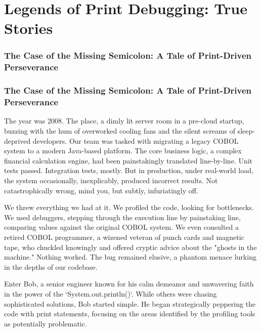 \documentclass{article}
\begin{document}
{{{{%

\part*{Legends of Print Debugging: True Stories} %
\label{part-8-Legends_of_Print_Debugging__True_Stories}


\section*{The Case of the Missing Semicolon: A Tale of Print-Driven Perseverance} %
\label{chapter-8-1-The_Case_of_the_Missing_Semicolon__A_Tal}

\section*{The Case of the Missing Semicolon: A Tale of Print-Driven Perseverance}

The year was 2008. The place, a dimly lit server room in a pre-cloud startup, buzzing with the hum of overworked cooling fans and the silent screams of sleep-deprived developers. Our team was tasked with migrating a legacy COBOL system to a modern Java-based platform. The core business logic, a complex financial calculation engine, had been painstakingly translated line-by-line. Unit tests passed. Integration tests, mostly. But in production, under real-world load, the system occasionally, inexplicably, produced incorrect results. Not catastrophically wrong, mind you, but subtly, infuriatingly off.

We threw everything we had at it. We profiled the code, looking for bottlenecks. We used debuggers, stepping through the execution line by painstaking line, comparing values against the original COBOL system. We even consulted a retired COBOL programmer, a wizened veteran of punch cards and magnetic tape, who chuckled knowingly and offered cryptic advice about the "ghosts in the machine." Nothing worked. The bug remained elusive, a phantom menace lurking in the depths of our codebase.

Enter Bob, a senior engineer known for his calm demeanor and unwavering faith in the power of the `System.out.println()`. While others were chasing sophisticated solutions, Bob started simple. He began strategically peppering the code with print statements, focusing on the areas identified by the profiling tools as potentially problematic.

}}}}
\end{document}
